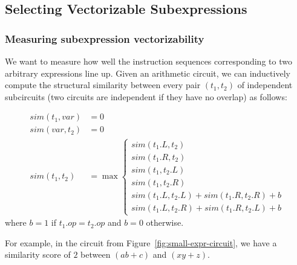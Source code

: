 \subsection{Selecting Vectorizable Subexpressions} %
\subsubsection*{Measuring subexpression vectorizability}
We want to measure how well the instruction sequences corresponding to two arbitrary expressions line up.
Given an arithmetic circuit, we can inductively compute the structural similarity between every pair $(t_1, t_2)$ of independent subcircuits (two circuits are independent if they have no overlap) as follows:

\begin{align*}
    sim(t_1, var) &= 0\\
    sim(var, t_2) &= 0\\
    sim(t_1, t_2) &= \max \begin{cases}
        sim(t_1.L, t_2)\\
        sim(t_1.R, t_2)\\
        sim(t_1, t_2.L)\\
        sim(t_1, t_2.R)\\
        sim(t_1.L, t_2.L) + sim(t_1.R, t_2.R) + b\\
        sim(t_1.L, t_2.R) + sim(t_1.R, t_2.L) + b
    \end{cases}
\end{align*}
where $b = 1$ if $t_1.op = t_2.op$ and $b = 0$ otherwise.

For example, in the circuit from Figure~\ref{fig:small-expr-circuit}, we have a similarity score of $2$ between $(ab + c)$ and $(xy + z)$.



